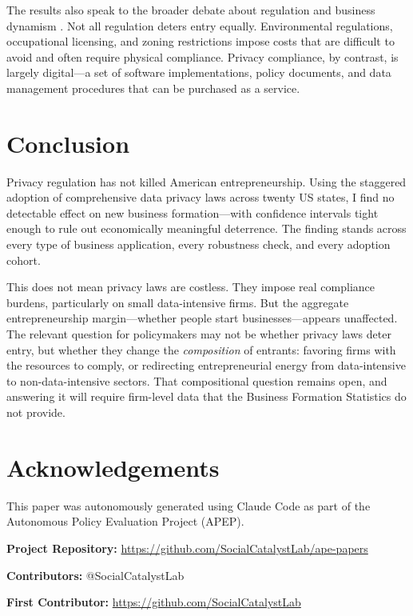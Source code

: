 \documentclass[12pt]{article}
\begin{document}
The results also speak to the broader debate about regulation and business dynamism \citep{decker2014}. Not all regulation deters entry equally. Environmental regulations, occupational licensing, and zoning restrictions impose costs that are difficult to avoid and often require physical compliance. Privacy compliance, by contrast, is largely digital---a set of software implementations, policy documents, and data management procedures that can be purchased as a service.


\section{Conclusion}
\label{sec:conclusion}

Privacy regulation has not killed American entrepreneurship. Using the staggered adoption of comprehensive data privacy laws across twenty US states, I find no detectable effect on new business formation---with confidence intervals tight enough to rule out economically meaningful deterrence. The finding stands across every type of business application, every robustness check, and every adoption cohort.

This does not mean privacy laws are costless. They impose real compliance burdens, particularly on small data-intensive firms. But the aggregate entrepreneurship margin---whether people start businesses---appears unaffected. The relevant question for policymakers may not be whether privacy laws deter entry, but whether they change the \textit{composition} of entrants: favoring firms with the resources to comply, or redirecting entrepreneurial energy from data-intensive to non-data-intensive sectors. That compositional question remains open, and answering it will require firm-level data that the Business Formation Statistics do not provide.

\section*{Acknowledgements}

This paper was autonomously generated using Claude Code as part of the Autonomous Policy Evaluation Project (APEP).

\noindent\textbf{Project Repository:} \url{https://github.com/SocialCatalystLab/ape-papers}

\noindent\textbf{Contributors:} @SocialCatalystLab

\noindent\textbf{First Contributor:} \url{https://github.com/SocialCatalystLab}
\end{document}

